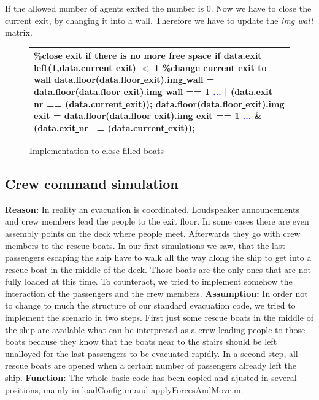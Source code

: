 \documentclass[11pt]{article}
\begin{document}
If the allowed number of agents exited the number is 0. Now we have to close the current exit, by changing it into a wall. Therefore we have to update the \textit{img\underline{ }wall} matrix.
\begin{figure}[h!]
\centering
\begin{tabular}
{|>{\large}m{\textwidth}|} \hline
\bigskip
\textcolor{commentcolor}{\%close exit if there is no more free space}
\newline
\textcolor{keywordcolor}{if} data.exit\underline{ } left(1,data.current\underline{ }exit) $<$ 1
\newline
\textcolor{commentcolor}{\%change current exit to wall}
\newline
data.floor(data.floor\underline{ }exit).img\underline{ }wall = data.floor(data.floor\underline{ }exit).img\underline{ }wall == 1 \textcolor{blue}{...}
\newline
| (data.exit\underline{ }nr == (data.current\underline{ }exit));
\newline
data.floor(data.floor\underline{ }exit).img\underline{ }exit = data.floor(data.floor\underline{ }exit).img\underline{ }exit == 1 \textcolor{blue}{...}
\newline
\& (data.exit\underline{ }nr ~= (data.current\underline{ }exit));
\bigskip
\\ \hline
\end{tabular}
\caption{Implementation to close filled  boats}
\end{figure}


\subsection{Crew command simulation}
\textbf{Reason:}
\newline 
In reality an evacuation is coordinated. Loudspeaker announcements and crew members lead the people to the exit floor. In some cases there are even assembly points on the deck where people meet. Afterwards they go with crew members to the rescue boats.
In our first simulations we saw, that the last passengers escaping the ship have to walk all the way along the ship to get into a rescue boat in the middle of the deck. Those boats are the only ones that are not fully loaded at this time. To counteract, we tried to implement somehow the interaction of the passengers and the crew members. 
\newline
\textbf{Assumption:}
\newline 
In order not to change to much the structure of our standard evacuation code, we tried to implement the scenario in two steps. First just some rescue boats in the middle of the ship are available what can be interpreted as a crew leading people to those boats because they know that the boats near to the stairs should be left unalloyed for the last passengers to be evacuated rapidly. In a second step, all rescue boats are opened when a certain number of passengers already left the ship.
 \newline
\textbf{Function:}
\newline 
The whole basic code has been copied and ajusted in several positions, mainly in loadConfig.m and applyForcesAndMove.m.
\end{document}
